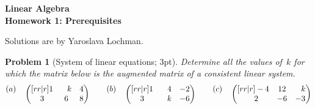 \documentclass[12pt,a4]{article}
\newtheorem{problem}{Problem}
\begin{document}
\begin{center}
  \Large\bf{Linear Algebra\\
    Homework 1: Prerequisites}
\end{center}
Solutions are by Yaroslava Lochman.


\begin{problem}[System of linear equations; 3pt]
	\rm Determine all the values of~$k$ for which the matrix below is the augmented matrix of a consistent linear system.
	\begin{equation*}
	\begin{matrix}  (a) \\ {} \end{matrix}
	\quad  \begin{pmatrix}[rr|r]
	1 & \hphantom{-}k & 4 \\ 3 & 6 & 8
	\end{pmatrix}
	\qquad
	\begin{matrix}  (b) \\ {} \end{matrix} \quad  \begin{pmatrix}[rr|r]
	1 & \hphantom{-}4 & -2 \\ 3 & \hphantom{-}k & -6
	\end{pmatrix}
	\qquad
	\begin{matrix}  (c) \\ {} \end{matrix} \quad  \begin{pmatrix}[rr|r]
	-4 & 12 & \hphantom{-}k \\ \hphantom{-}2 & -6 & -3
	\end{pmatrix}
	\end{equation*}
\end{problem}
\end{document}
